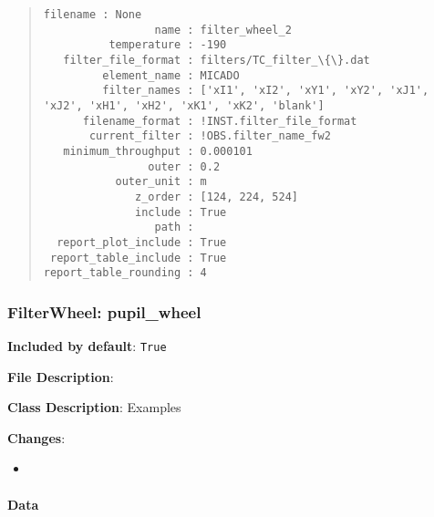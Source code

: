 \begin{quote}
\begin{alltt}
\begin{lstlisting}[frame=single]
             filename : None
                 name : filter_wheel_2
          temperature : -190
   filter_file_format : filters/TC_filter_\{\}.dat
         element_name : MICADO
         filter_names : ['xI1', 'xI2', 'xY1', 'xY2', 'xJ1', 'xJ2', 'xH1', 'xH2', 'xK1', 'xK2', 'blank']
      filename_format : !INST.filter_file_format
       current_filter : !OBS.filter_name_fw2
   minimum_throughput : 0.000101
                outer : 0.2
           outer_unit : m
              z_order : [124, 224, 524]
              include : True
                 path :
  report_plot_include : True
 report_table_include : True
report_table_rounding : 4
\end{lstlisting}
\end{alltt}
\end{quote}


\subsubsection{FilterWheel: \textquotedbl{}pupil\_wheel\textquotedbl{}%
  \label{filterwheel-pupil-wheel}%
}

\textbf{Included by default}: \texttt{True}

\textbf{File Description}:

\textbf{Class Description}: Examples

\textbf{Changes}:

\begin{itemize}
\item \end{itemize}


\paragraph{Data%
  \label{id7}%
}

\begin{figure}[H]
\noindent{}\label{fig-pupil-wheel}
\end{figure}

